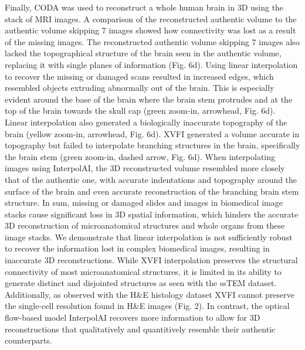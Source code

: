 \begin{refsection}
    Finally, CODA was used to reconstruct a whole human brain in 3D using the stack of MRI images. A comparison of the reconstructed authentic volume to the authentic volume skipping 7 images showed how connectivity was lost as a result of the missing images. The reconstructed authentic volume skipping 7 images also lacked the topographical structure of the brain seen in the authentic volume, replacing it with single planes of information (Fig. 6d). Using linear interpolation to recover the missing or damaged scans resulted in increased edges, which resembled objects extruding abnormally out of the brain. This is especially evident around the base of the brain where the brain stem protrudes and at the top of the brain towards the skull cap (green zoom-in, arrowhead, Fig. 6d). Linear interpolation also generated a biologically inaccurate topography of the brain (yellow zoom-in, arrowhead, Fig. 6d). XVFI generated a volume accurate in topography but failed to interpolate branching structures in the brain, specifically the brain stem (green zoom-in, dashed arrow, Fig. 6d). When interpolating images using InterpolAI, the 3D reconstructed volume resembled more closely that of the authentic one, with accurate indentations and topography around the surface of the brain and even accurate reconstruction of the branching brain stem structure. 
    In sum, missing or damaged slides and images in biomedical image stacks cause significant loss in 3D spatial information, which hinders the accurate 3D reconstruction of microanatomical structures and whole organs from these image stacks. We demonstrate that linear interpolation is not sufficiently robust to recover the information lost in complex biomedical images, resulting in inaccurate 3D reconstructions. While XVFI interpolation preserves the structural connectivity of most microanatomical structures, it is limited in its ability to generate distinct and disjointed structures as seen with the ssTEM dataset. Additionally, as observed with the H\&E histology dataset XVFI cannot preserve the single-cell resolution found in H\&E images (Fig. 2). In contrast, the optical flow-based model InterpolAI recovers more information to allow for 3D reconstructions that qualitatively and quantitively resemble their authentic counterparts.


\end{refsection}
